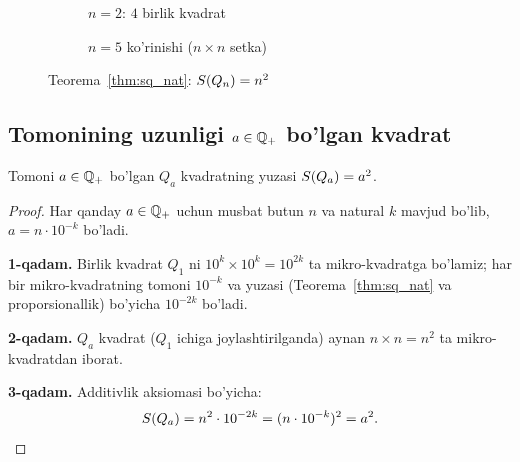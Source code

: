 \begin{figure}[h]
\centering
\begin{subfigure}[b]{0.30\textwidth}
\centering
{}
\caption{$n=2$: $4$ birlik kvadrat}
\end{subfigure}
\hfill
\begin{subfigure}[b]{0.60\textwidth}
\centering
{}
\caption{$n=5$ ko'rinishi ($n\times n$ setka)}
\end{subfigure}
\caption{Teorema~\ref{thm:sq_nat}: $S\!\left(Q_n\right)=n^2$}
\label{fig:sq_nat}
\end{figure}

\subsection{Tomonining uzunligi \texorpdfstring{$a \in \mathbb{Q}_{+}$}{a ∈ Q+} bo'lgan kvadrat}
\label{subsec:sqq}

\begin{teorema}
\label{thm:sq_rat}
Tomoni $a \in \mathbb{Q}_{+}$ bo'lgan $Q_a$ kvadratning yuzasi $S\!\left(Q_a\right) = a^2$.
\end{teorema}
\begin{proof}
Har qanday $a\in\mathbb{Q}_{+}$ uchun musbat butun $n$ va natural $k$ mavjud bo'lib,
$a = n\cdot 10^{-k}$ bo'ladi.

\textbf{1-qadam.} Birlik kvadrat $Q_1$ ni $10^k \times 10^k = 10^{2k}$ ta
mikro-kvadratga bo'lamiz; har bir mikro-kvadratning tomoni $10^{-k}$ va yuzasi
(Teorema~\ref{thm:sq_nat} va proporsionallik) bo'yicha $10^{-2k}$ bo'ladi.

\textbf{2-qadam.} $Q_a$ kvadrat ($Q_1$ ichiga joylashtirilganda) aynan
$n \times n = n^2$ ta mikro-kvadratdan iborat.

\textbf{3-qadam.} Additivlik aksiomasi bo'yicha:
\[
  S\!\left(Q_a\right) = n^2 \cdot 10^{-2k} = (n \cdot 10^{-k})^2 = a^2. \qedhere
\]
\end{proof}


